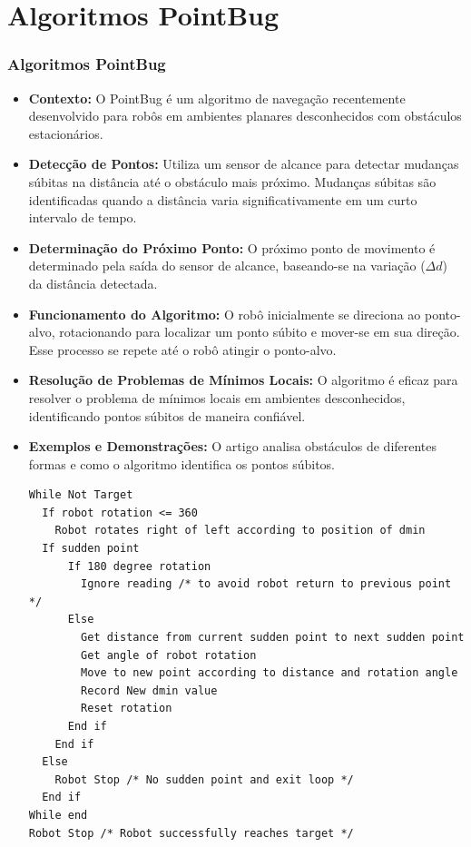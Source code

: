 \documentclass[xcolor=dvipsnames, aspectratio=169]{beamer}
\begin{document}
\section{Algoritmos PointBug}
\begin{frame}
  \frametitle{Algoritmos PointBug}
  \begin{itemize}
    \item \textbf{Contexto:} O PointBug é um algoritmo de navegação recentemente desenvolvido para robôs em ambientes planares desconhecidos com obstáculos estacionários.
    \item \textbf{Detecção de Pontos:} Utiliza um sensor de alcance para detectar mudanças súbitas na distância até o obstáculo mais próximo. Mudanças súbitas são identificadas quando a distância varia significativamente em um curto intervalo de tempo.
    \item \textbf{Determinação do Próximo Ponto:} O próximo ponto de movimento é determinado pela saída do sensor de alcance, baseando-se na variação ($\Delta{d}$) da distância detectada.
    \item \textbf{Funcionamento do Algoritmo:} O robô inicialmente se direciona ao ponto-alvo, rotacionando para localizar um ponto súbito e mover-se em sua direção. Esse processo se repete até o robô atingir o ponto-alvo.
    \item \textbf{Resolução de Problemas de Mínimos Locais:} O algoritmo é eficaz para resolver o problema de mínimos locais em ambientes desconhecidos, identificando pontos súbitos de maneira confiável.
    \item \textbf{Exemplos e Demonstrações:} O artigo \cite{buniyamin2011simple} analisa obstáculos de diferentes formas e como o algoritmo identifica os pontos súbitos.
\begin{lstlisting}
While Not Target
  If robot rotation <= 360
    Robot rotates right of left according to position of dmin
  If sudden point
      If 180 degree rotation
        Ignore reading /* to avoid robot return to previous point */
      Else
        Get distance from current sudden point to next sudden point
        Get angle of robot rotation
        Move to new point according to distance and rotation angle
        Record New dmin value
        Reset rotation
      End if
    End if
  Else
    Robot Stop /* No sudden point and exit loop */
  End if
While end
Robot Stop /* Robot successfully reaches target */
\end{lstlisting}
  \end{itemize}
\end{frame}
  
\end{document}
